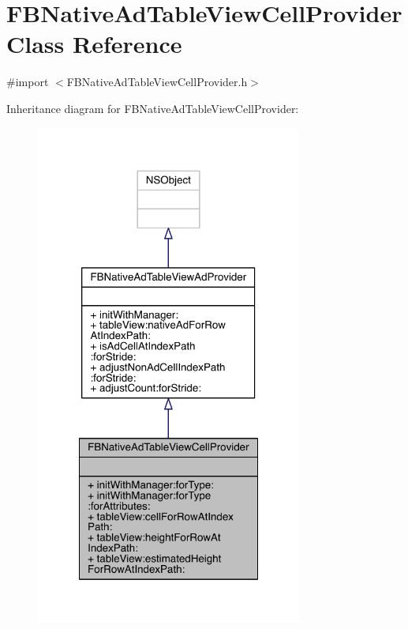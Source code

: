 \hypertarget{interface_f_b_native_ad_table_view_cell_provider}{\section{F\-B\-Native\-Ad\-Table\-View\-Cell\-Provider Class Reference}
\label{interface_f_b_native_ad_table_view_cell_provider}
}


{\ttfamily \#import $<$F\-B\-Native\-Ad\-Table\-View\-Cell\-Provider.\-h$>$}



Inheritance diagram for F\-B\-Native\-Ad\-Table\-View\-Cell\-Provider\-:
\nopagebreak
\begin{figure}[H]
\begin{center}
\leavevmode
\includegraphics[width=248pt]{interface_f_b_native_ad_table_view_cell_provider__inherit__graph}
\end{center}
\end{figure}


